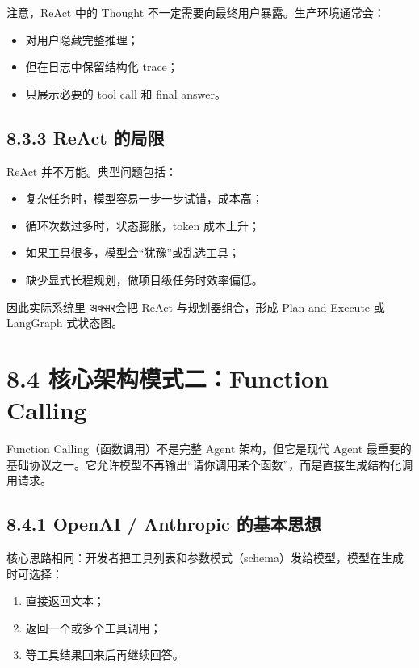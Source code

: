 注意，ReAct 中的 Thought 不一定需要向最终用户暴露。生产环境通常会：


\begin{itemize}[leftmargin=2em]
\item 对用户隐藏完整推理；
\item 但在日志中保留结构化 trace；
\item 只展示必要的 tool call 和 final answer。
\end{itemize}

\subsection{8.3.3 ReAct 的局限}

ReAct 并不万能。典型问题包括：


\begin{itemize}[leftmargin=2em]
\item 复杂任务时，模型容易一步一步试错，成本高；
\item 循环次数过多时，状态膨胀，token 成本上升；
\item 如果工具很多，模型会``犹豫''或乱选工具；
\item 缺少显式长程规划，做项目级任务时效率偏低。
\end{itemize}

因此实际系统里 अक्सर会把 ReAct 与规划器组合，形成 Plan-and-Execute 或 LangGraph 式状态图。


\section{8.4 核心架构模式二：Function Calling}

Function Calling（函数调用）不是完整 Agent 架构，但它是现代 Agent 最重要的基础协议之一。它允许模型不再输出``请你调用某个函数''，而是直接生成结构化调用请求。


\subsection{8.4.1 OpenAI / Anthropic 的基本思想}

核心思路相同：开发者把工具列表和参数模式（schema）发给模型，模型在生成时可选择：


\begin{enumerate}[leftmargin=2em]
\item 直接返回文本；
\item 返回一个或多个工具调用；
\item 等工具结果回来后再继续回答。
\end{enumerate}

